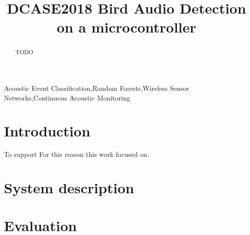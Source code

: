 \documentclass{article}
\title{DCASE2018 Bird Audio Detection on a microcontroller}
\begin{document}
\ninept
\maketitle

\begin{sloppy}

\begin{abstract}
TODO
\end{abstract}

\begin{keywords}
Acoustic Event Classification,Random Forests,Wireless Sensor Networks,Continuous Acoustic Monitoring
\end{keywords}


\section{Introduction}
\label{sec:intro}

To support 
For this reason this work focused on.
\cite{dStowell2014}

\cite{dcase2018web}


\section{System description}
\label{sec:system}


\section{Evaluation}
\label{sec:evaluation}


\end{sloppy}
\end{document}
